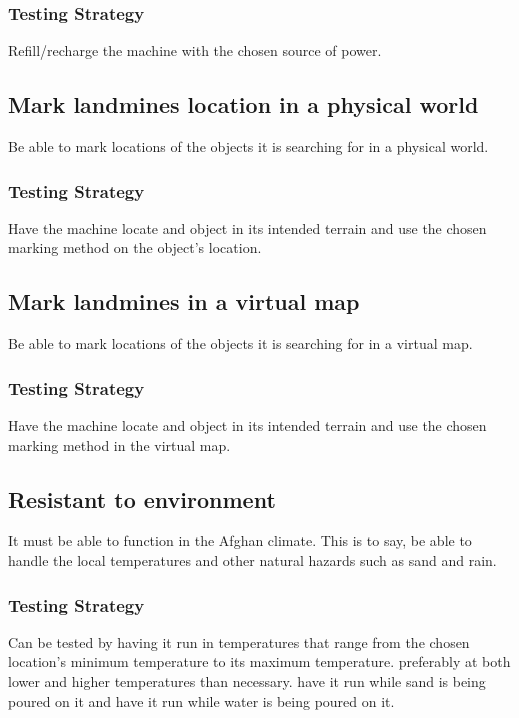 \subsubsection*{Testing Strategy}
Refill/recharge the machine with the chosen source of power.


\subsection{Mark landmines location in a physical world}\label{R9}
Be able to mark locations of the objects it is searching for in a physical world.

\subsubsection*{Testing Strategy}
Have the machine locate and object in its intended terrain and use the chosen marking method on the object's location.


\subsection{Mark landmines in a virtual map}\label{R10}
Be able to mark locations of the objects it is searching for in a virtual map.

\subsubsection*{Testing Strategy}
Have the machine locate and object in its intended terrain and use the chosen marking method in the virtual map.



\newpage

\subsection{Resistant to environment}\label{R11}
It must be able to function in the Afghan climate. This is to say, be able to handle the local temperatures and other natural hazards such as sand and rain.

\subsubsection*{Testing Strategy}
Can be tested by having it run in temperatures that range from the chosen location’s minimum temperature to its maximum temperature. preferably at both lower and higher temperatures than necessary. have it run while sand is being poured on it and have it run while water is being poured on it.


